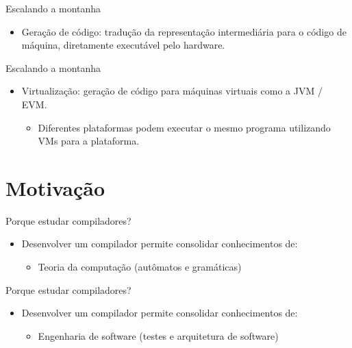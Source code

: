 \begin{frame}{Escalando a montanha}

    \begin{itemize}

        \item
        Geração de código: tradução da representação intermediária para o
        código de máquina, diretamente executável pelo hardware.
    \end{itemize}
\end{frame}

\begin{frame}{Escalando a montanha}

    \begin{itemize}

        \item
        Virtualização: geração de código para máquinas virtuais como a JVM /
        EVM.

        \begin{itemize}

            \item
            Diferentes plataformas podem executar o mesmo programa utilizando
            VMs para a plataforma.
        \end{itemize}
    \end{itemize}
\end{frame}


\section{Motivação}\label{motivauxe7uxe3o}

\begin{frame}{Porque estudar compiladores?}

    \begin{itemize}

        \item
        Desenvolver um compilador permite consolidar conhecimentos de:

        \begin{itemize}

            \item
            Teoria da computação (autômatos e gramáticas)
        \end{itemize}
    \end{itemize}
\end{frame}

\begin{frame}{Porque estudar compiladores?}

    \begin{itemize}

        \item
        Desenvolver um compilador permite consolidar conhecimentos de:

        \begin{itemize}

            \item
            Engenharia de software (testes e arquitetura de software)
        \end{itemize}
    \end{itemize}
\end{frame}

